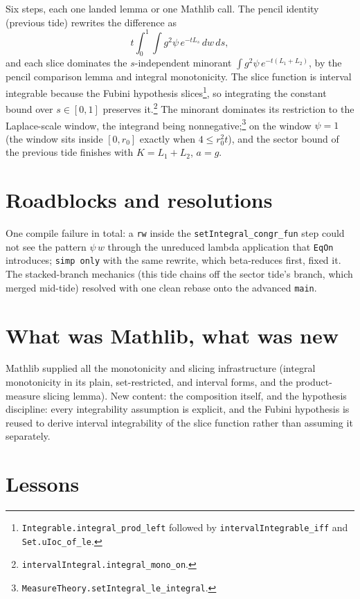 \documentclass[11pt]{article}
\begin{document}
Six steps, each one landed lemma or one Mathlib call. The pencil identity
(previous tide) rewrites the difference as
\[
t \int_0^1 \!\! \int g^2 \psi\, e^{-t L_s}\, dw\, ds ,
\]
and each slice dominates the $s$-independent minorant
$\int g^2 \psi\, e^{-t(L_1+L_2)}$, by the pencil comparison lemma and
integral monotonicity. The slice function is interval
integrable because the Fubini hypothesis slices\footnote{%
\texttt{Integrable.integral\_prod\_left} followed by
\texttt{intervalIntegrable\_iff} and \texttt{Set.uIoc\_of\_le}.}, so
integrating the constant bound over $s \in [0,1]$ preserves
it.\footnote{\texttt{intervalIntegral.integral\_mono\_on}.} The minorant
dominates its restriction to the Laplace-scale window, the integrand being
nonnegative;\footnote{\texttt{MeasureTheory.setIntegral\_le\_integral}.}
on the window $\psi = 1$ (the window
sits inside $[0, r_0]$ exactly when $4 \leq r_0^2 t$), and the sector bound
of the previous tide finishes with $K = L_1 + L_2$, $a = g$.

\section{Roadblocks and resolutions}

One compile failure in total: a \texttt{rw} inside the
\texttt{setIntegral\_congr\_fun} step could not see the pattern
$\psi\,w$ through the unreduced lambda application that \texttt{EqOn}
introduces; \texttt{simp only} with the same rewrite, which beta-reduces
first, fixed it. The stacked-branch mechanics (this tide chains off the
sector tide's branch, which merged mid-tide) resolved with one clean rebase
onto the advanced \texttt{main}.

\section{What was Mathlib, what was new}

Mathlib supplied all the monotonicity and slicing infrastructure (integral
monotonicity in its plain, set-restricted, and interval forms, and the
product-measure slicing lemma). New content: the composition itself, and the hypothesis
discipline: every integrability assumption is explicit, and the Fubini
hypothesis is reused to derive interval integrability of the slice function
rather than assuming it separately.

\section{Lessons}
\end{document}
